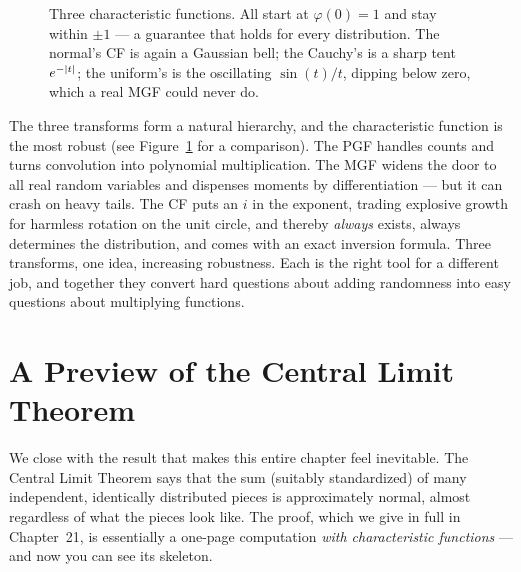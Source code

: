 \begin{figure}[H]
\centering
{}
\caption{Three characteristic functions. All start at $\varphi(0)=1$ and stay
within $\pm 1$ --- a guarantee that holds for every distribution. The normal's
CF is again a Gaussian bell; the Cauchy's is a sharp tent $e^{-\lvert t\rvert}$; the
uniform's is the oscillating $\sin(t)/t$, dipping below zero, which a real MGF
could never do.}
\label{ch18:fig-cf}
\end{figure}

\begin{aestheticbox}
The three transforms form a natural hierarchy, and the characteristic function is the most robust (see Figure~\ref{ch18:fig-cf} for a comparison). The PGF handles counts and turns
convolution into polynomial multiplication. The MGF widens the door to all real
random variables and dispenses moments by differentiation --- but it can crash
on heavy tails. The CF puts an $i$ in the exponent, trading explosive growth for
harmless rotation on the unit circle, and thereby \emph{always} exists, always
determines the distribution, and comes with an exact inversion formula. Three
transforms, one idea, increasing robustness. Each is the right tool for a
different job, and together they convert hard questions about adding randomness
into easy questions about multiplying functions.
\end{aestheticbox}

\section{A Preview of the Central Limit Theorem}
\label{ch18:clt-preview}

We close with the result that makes this entire chapter feel inevitable. The
Central Limit Theorem says that the sum (suitably standardized) of many
independent, identically distributed pieces is approximately normal, almost
regardless of what the pieces look like. The proof, which we give in full in
Chapter~21, is essentially a one-page computation \emph{with characteristic
functions} --- and now you can see its skeleton.

